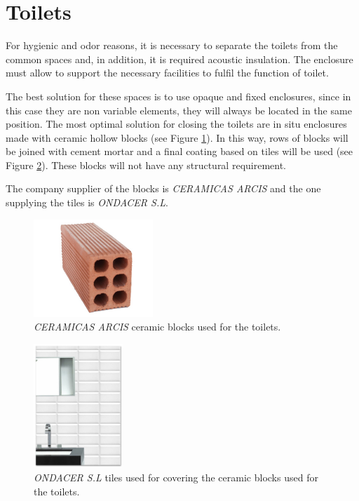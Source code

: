	\section{Toilets}
For hygienic and odor reasons, it is necessary to separate the toilets from the common spaces and, in addition, it is required acoustic insulation. The enclosure must allow to support the necessary facilities to fulfil the function of toilet.

The best solution for these spaces is to use opaque and fixed enclosures, since in this case they are non variable elements, they will always be located in the same position. The most optimal solution for closing the toilets are in situ enclosures made with ceramic hollow blocks (see Figure \ref{block}). In this way, rows of blocks will be joined with cement mortar and a final coating based on tiles will be used (see Figure \ref{tiles}). These blocks will not have any structural requirement.

The company supplier of the blocks is \textit{CERAMICAS ARCIS} and the one supplying the tiles is \textit{ONDACER  S.L}.

\begin{figure}[H]
	\centering
	\includegraphics[clip, trim=0cm 0cm 0cm 0cm, width=0.4\textwidth]{./images/indoorclosures/block}
	\caption{\textit{CERAMICAS ARCIS} ceramic blocks used for the toilets.}
	\label{block}
\end{figure}

\begin{figure}[H]
	\centering
	\includegraphics[clip, trim=0cm 0cm 0cm 0cm, width=0.3\textwidth]{./images/indoorclosures/tiles}
	\caption{\textit{ONDACER  S.L} tiles used for covering the ceramic blocks used for the toilets.}
	\label{tiles}
\end{figure}

